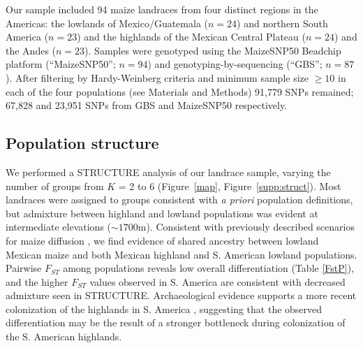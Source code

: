 Our sample included 94 maize landraces from four distinct regions in the Americas: the lowlands of Mexico/Guatemala ($n=24$) and northern South America ($n=23$) and the highlands of the Mexican Central Plateau ($n=24$) and the Andes ($n=23$). 
Samples were genotyped using the MaizeSNP50 Beadchip platform (``MaizeSNP50''; $n=94$) and genotyping-by-sequencing (``GBS''; $n=87$). 
After filtering by Hardy-Weinberg criteria and minimum sample size $\geq10$ in each of the four populations (see Materials and Methods) 91,779 SNPs remained; 67,828 and 23,951 SNPs from GBS and MaizeSNP50 respectively.  

\subsection*{Population structure}

We performed a {\sf STRUCTURE} analysis \cite[]{Pritchard_2000_10835412,Falush_2003_12930761} of our landrace sample, varying the number of groups from $K$ = 2 to 6 (Figure~\ref{map}, Figure~\ref{supp:struct}). 
Most landraces were assigned to groups consistent with \emph{a priori} population definitions, but admixture between highland and lowland populations was evident at intermediate elevations ($\sim1700$m).  Consistent with previously described scenarios for maize diffusion \cite[]{Piperno_2006_69}, we find evidence of shared ancestry between lowland Mexican maize and both Mexican highland and S. American lowland populations.  Pairwise $F_{ST}$ among populations reveals low overall differentiation (Table \ref{FstP}), and the higher $F_{ST}$ values observed in S. America are consistent with decreased admixture seen in STRUCTURE.  Archaeological evidence supports a more recent colonization of the highlands in S. America  \cite[]{Piperno_2006_69,Perry_2006_16511492,Grobman_2012_22307642}, suggesting that the observed differentiation may be the result of a stronger bottleneck during colonization of the S. American highlands. 

